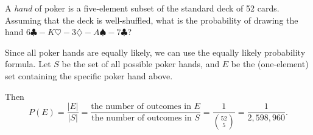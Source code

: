 \documentclass[10pt]{beamer}
\begin{document}
\begin{frame}

\begin{myyellowbox}[title=\text{Poll (Practice Reading Quiz)}]
A \textit{hand} of poker is a five-element subset of the standard deck of 52 cards.   Assuming that the deck is well-shuffled, what is the probability of drawing the hand $6 \clubsuit -K \heartsuit - 3 \diamondsuit - A \spadesuit - 7 \clubsuit$?
\end{myyellowbox}
\vfill \vfill 
\pause 

\begin{mygreenbox}[title=\text{Solution}]
Since all poker hands are equally likely, we can use the equally likely probability formula.  Let $S$ be the set of all possible poker hands, and $E$ be the (one-element) set containing the specific poker hand above.  

\vspace{.2cm}

Then
\[P(E) = \frac{|E|}{|S|} = \frac{\text{the number of outcomes in } E }{\text{the number of outcomes in } S}	 = \frac{1}{\binom{52}{5}} = \frac{1}{2,598,960}.\]

\end{mygreenbox}
	
\end{frame}
\end{document}
